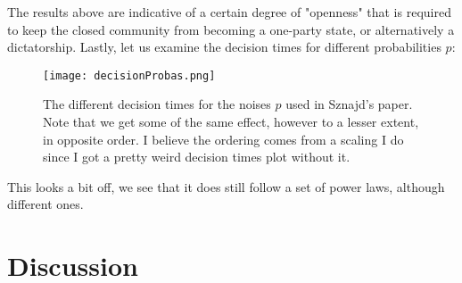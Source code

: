 \documentclass{article}
\begin{document}
The results above are indicative of a certain degree of "openness" that is required to keep the closed community from becoming a one-party state, or alternatively a dictatorship. \newline
Lastly, let us examine the decision times for different probabilities $p$:
\begin{figure}[ht!]
    \centering
    \texttt{[image: decisionProbas.png]}
    \caption{The different decision times for the noises $p$ used in Sznajd's paper. \newline
    Note that we get some of the same effect, however to a lesser extent, in opposite order. I believe the ordering comes from a scaling I do since I got a pretty weird decision times plot without it.}
    \label{fig6}
\end{figure} \newline
This looks a bit off, we see that it does still follow a set of power laws, although different ones.\newpage
\section{Discussion}
\end{document}
